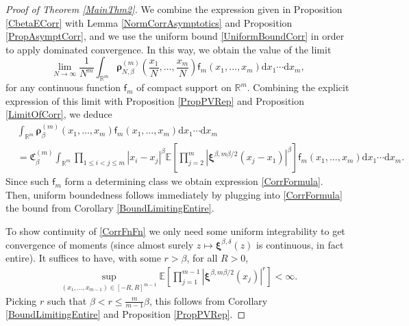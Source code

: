 \documentclass[]{article}
\begin{document}
\begin{proof} [Proof of Theorem \ref{MainThm2}]
  We combine the expression given in Proposition \ref{CbetaECorr} with Lemma \ref{NormCorrAsymptotics} and Proposition \ref{PropAsymptCorr}, and we use the uniform bound \eqref{UniformBoundCorr} in order to apply 
  dominated convergence. In this way, we obtain 
the value of the limit
\begin{equation*}
\lim_{N\to \infty} \frac{1}{N^m}\int_{\mathbb{R}^m}\boldsymbol{\rho}_{N,\beta}^{(m)}\left(\frac{x_1}{N},\dots,\frac{x_m}{N}\right)\mathsf{f}_m(x_1,\dots,x_m)\mathrm{d}x_1\cdots\mathrm{d}x_m,
\end{equation*}
for any continuous function $\mathsf{f}_m$ of compact support on $\mathbb{R}^m$.
Combining the explicit expression of this limit with 
 Proposition \ref{PropPVRep} and  Proposition \ref{LimitOfCorr}, we deduce 
\begin{align*}
&\int_{\mathbb{R}^m}\boldsymbol{\rho}_\beta^{(m)}(x_1,\dots,x_m)\mathsf{f}_m(x_1,\dots,x_m)\mathrm{d}x_1\cdots\mathrm{d}x_m\\
&=\mathfrak{C}_{\beta}^{(m)} \int_{\mathbb{R}^m}\prod_{1\le i<j \le m}\left|x_i-x_j\right|^\beta \mathbb{E}\left[\prod_{j=2}^m \left|\boldsymbol{\xi}^{\beta,m\beta/2}\left(x_j-x_1\right)\right|^\beta\right]\mathsf{f}_m(x_1,\dots,x_m)\mathrm{d}x_1\cdots\mathrm{d}x_m.
\end{align*}
Since such $\mathsf{f}_m$ form a determining class we obtain expression \eqref{CorrFormula}. Then, uniform boundedness follows immediately by plugging into \eqref{CorrFormula} the bound from Corollary \ref{BoundLimitingEntire}.

To show continuity of \eqref{CorrFnFn} we only need some uniform integrability to get convergence of moments (since almost surely $z\mapsto \boldsymbol{\xi}^{\beta,\delta}(z)$ is continuous, in fact entire). It suffices to have, with some $r>\beta$, for all $R>0$,
\begin{align*}
\sup_{(x_1,\dots,x_{m-1})\in [-R,R]^{m-1}}\mathbb{E}\left[\prod_{j=1}^{m-1}\left|\boldsymbol{\xi}^{\beta,m\beta/2}(x_j)\right|^r\right]<\infty.
\end{align*}
Picking $r$ such that $\beta<r\le\frac{m}{m-1}\beta$, this follows from Corollary \ref{BoundLimitingEntire} and Proposition \ref{PropPVRep}.


\end{proof}
\end{document}
